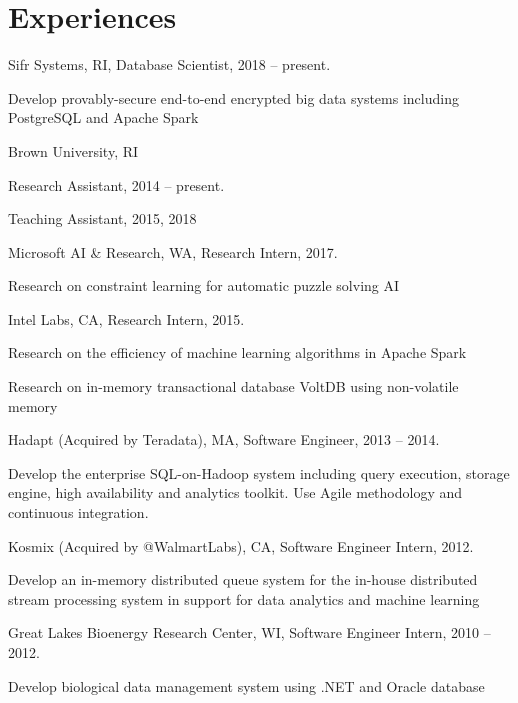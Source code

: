 \documentclass[letterpaper]{article}
\renewenvironment{itemize}{
  \begin{list}{}{
    \setlength{\leftmargin}{1.5em}
  }
}{
  \end{list}
}
\begin{document}
\section*{Experiences}

\begin{itemize}
\item Sifr Systems, RI, Database Scientist, 2018 -- present.
	\begin{itemize}
		\item Develop provably-secure end-to-end encrypted big data systems including PostgreSQL and 
		Apache Spark
	\end{itemize}
\item Brown University, RI
	\begin{itemize}
		\item Research Assistant, 2014 -- present.
		\item Teaching Assistant, 2015, 2018
	\end{itemize}
\item Microsoft AI \& Research, WA, Research Intern, 2017.
	\begin{itemize}
		\item Research on constraint learning for automatic puzzle solving AI
	\end{itemize}
\item Intel Labs, CA, Research Intern, 2015.
	\begin{itemize}
		\item Research on the efficiency of machine learning algorithms in Apache Spark
		\item Research on in-memory transactional database VoltDB using non-volatile memory
	\end{itemize}
\item Hadapt (Acquired by Teradata), MA, Software Engineer, 2013 -- 2014.
	\begin{itemize}
		\item Develop the enterprise SQL-on-Hadoop system including query execution, storage engine, high availability and analytics toolkit.  Use Agile methodology and continuous integration.
	\end{itemize}
\item Kosmix (Acquired by @WalmartLabs), CA, Software Engineer Intern, 2012.
	\begin{itemize}
		\item Develop an in-memory distributed queue system for the in-house distributed stream processing system in support for data analytics and machine learning
	\end{itemize}
\item Great Lakes Bioenergy Research Center, WI, Software Engineer Intern, 2010 -- 2012.
	\begin{itemize}
		\item Develop biological data management system using .NET and Oracle database
	\end{itemize}
\end{itemize}
\end{document}
